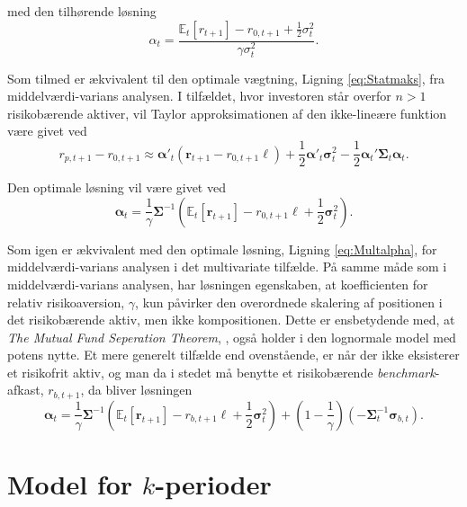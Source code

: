 \documentclass[
  a4paper,
  oneside]{memoir}
\begin{document}
med den tilhørende løsning
\begin{equation}
\alpha_t=\frac{\mathbb{E}_t[r_{t+1}] - r_{0,t+1}+\frac{1}{2}\sigma_t^2}{\gamma\sigma_t^2}.
\end{equation}

Som tilmed er ækvivalent til den optimale vægtning, Ligning \eqref{eq:Statmaks}, fra middelværdi-varians analysen. I tilfældet, hvor investoren står overfor \(n>1\) risikobærende aktiver, vil Taylor approksimationen af den ikke-lineære funktion være givet ved
\begin{equation}
r_{p,t+1}-r_{0,t+1}\approx \bm{\alpha}'_t (\bm{r}_{t+1}-r_{0,t+1}\bm{\ell})+\frac{1}{2}\bm{\alpha}'_t\bm{\sigma}_t^2 - \frac{1}{2} \bm{\alpha}_t'\bm{\Sigma}_t\bm{\alpha}_t. \label{eq:Multtaylor}
\end{equation}

Den optimale løsning vil være givet ved
\begin{equation}
\bm{\alpha}_t=\frac{1}{\gamma}\bm{\Sigma}^{-1}\left(\mathbb{E}_t[\bm{r}_{t+1}]-r_{0,t+1}\bm{\ell}+\frac{1}{2}\bm{\sigma}_t^2\right).\label{eq:Potmultalpha}
\end{equation}

Som igen er ækvivalent med den optimale løsning, Ligning \eqref{eq:Multalpha}, for middelværdi-varians analysen i det multivariate tilfælde. På samme måde som i middelværdi-varians analysen, har løsningen egenskaben, at koefficienten for relativ risikoaversion, \(\gamma\), kun påvirker den overordnede skalering af positionen i det risikobærende aktiv, men ikke kompositionen. Dette er ensbetydende med, at \textit{The Mutual Fund Seperation Theorem}, \citep{Tobin1958}, også holder i den lognormale model med potens nytte. Et mere generelt tilfælde end ovenstående, er når der ikke eksisterer et risikofrit aktiv, og man da i stedet må benytte et risikobærende \emph{benchmark}-afkast, \(r_{b,t+1}\), da bliver løsningen
\begin{equation}
\bm{\alpha}_t=\frac{1}{\gamma}\bm{\Sigma}^{-1}\left(\mathbb{E}_t[\bm{r}_{t+1}]-r_{b,t+1}\bm{\ell}+\frac{1}{2}\bm{\sigma}_t^2\right)+\left(1-\frac{1}{\gamma}\right)\left(-\bm{\Sigma}_t^{-1}\bm{\sigma}_{b,t}\right).
\end{equation}

\hypertarget{modkper}{%
\section{\texorpdfstring{Model for \(k\)-perioder}{Model for k-perioder}}\label{modkper}}
\end{document}
